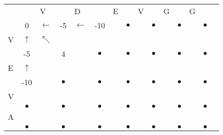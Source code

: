 \documentclass[landscape]{foils}
\begin{document}
\myNewSlide
{
\normalsize
\begin{center}
\begin{tabular}{lclclclclclclcl}
   &              & V             &  & D & & E & & V & & G & & G \\   
   & {\color{black} 0}      & {\color{green}$\leftarrow$}   & -5 &   {\color{green}$\leftarrow$} & -10 &    & {\color{black}$\bullet$}&    & {\color{black}$\bullet$}&    & {\color{black}$\bullet$}&    & {\color{black}$\bullet$} \\
V  & {\color{green} $\uparrow$} & {\color{green}$\nwarrow$}    & {\color{black} $$ } &     & {\color{black} $$ } & {\color{black} $$} &     & {\color{black} $$ } &     & {\color{black} $$ } & {\color{black} $$} &     & {\color{black} $$ } &       \\
   & -5     &  & 4        &    & {\color{black}$\bullet$} &    & {\color{black}$\bullet$}&    & {\color{black}$\bullet$}&    & {\color{black}$\bullet$}&    & {\color{black}$\bullet$} \\
E  & {\color{green} $\uparrow$} &     & {\color{black} $$ } &     & {\color{black} $$ } & {\color{black} $$} &     & {\color{black} $$ } &     & {\color{black} $$ } & {\color{black} $$} &     & {\color{black} $$ } &       \\
   & -10 &    & {\color{black} $\bullet$}        &    & {\color{black}$\bullet$} &    & {\color{black}$\bullet$}&    & {\color{black}$\bullet$}&    & {\color{black}$\bullet$}&    & {\color{black}$\bullet$} \\
V  & {\color{black} $$} &     & {\color{black} $$ } &     & {\color{black} $$ } & {\color{black} $$} &     & {\color{black} $$ } &     & {\color{black} $$ } & {\color{black} $$} &     & {\color{black} $$ } &       \\   & {\color{black} $\bullet$}      &    & {\color{black} $\bullet$}        &    & {\color{black}$\bullet$} &    & {\color{black}$\bullet$}&    & {\color{black}$\bullet$}&    & {\color{black}$\bullet$}&    & {\color{black}$\bullet$} \\
A  & {\color{black} $$} &     & {\color{black} $$ } &     & {\color{black} $$ } & {\color{black} $$} &     & {\color{black} $$ } &     & {\color{black} $$ } & {\color{black} $$} &     & {\color{black} $$ } &       \\   & {\color{black} $\bullet$}      &    & {\color{black} $\bullet$}        &    & {\color{black}$\bullet$} &    & {\color{black}$\bullet$}&    & {\color{black}$\bullet$}&    & {\color{black}$\bullet$}&    & {\color{black}$\bullet$} \\

\end{tabular}
\end{center}}
\end{document}
